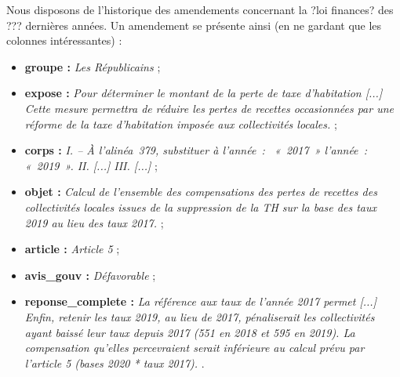 \documentclass{article}
\begin{document}
Nous disposons de l'historique des amendements concernant la ?loi finances? des ??? dernières années. Un amendement se présente ainsi (en ne gardant que les colonnes intéressantes) :
\begin{itemize}
\item  \textbf{groupe :} \emph{Les Républicains} ;
\item \textbf{expose :} \emph{Pour déterminer le montant de la perte de taxe d’habitation [...] %
Cette mesure permettra de réduire les pertes de recettes occasionnées par une réforme de la taxe d’habitation imposée aux collectivités locales.
} ;
\item \textbf{corps :} \emph{I. – À l’alinéa 379, substituer à l’année : 
« 2017 »
l’année :
« 2019 ».
II. [...]%
III. [...]%
} ;
\item  \textbf{objet :} \emph{Calcul de l’ensemble des compensations des pertes de recettes des collectivités locales issues de la suppression de la TH sur la base des taux 2019 au lieu des taux 2017.} ;
\item \textbf{article :} \emph{Article 5} ;
\item \textbf{avis\_gouv :} \emph{Défavorable} ;
\item \textbf{reponse\_complete :} \emph{La référence aux taux de l’année 2017 permet [...] %
Enfin, retenir les taux 2019, au lieu de 2017, pénaliserait les collectivités ayant baissé leur taux depuis 2017 (551 en 2018 et 595 en 2019). La compensation qu’elles percevraient serait inférieure au calcul prévu par l’article 5 (bases 2020 * taux 2017).
}.
\end{itemize}
\end{document}
